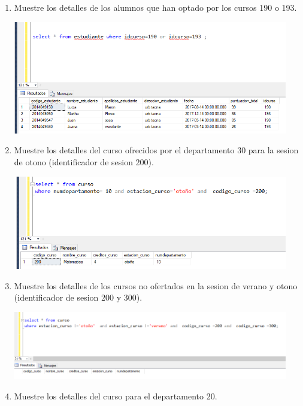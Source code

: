 \documentclass[12pt,letterpaper]{article}
\begin{document}
\begin{enumerate}[1.]
    \item Muestre los detalles de los alumnos que han optado por los cursos 190 o 193.

\begin{center}
\includegraphics[width=12cm]{./IMAGENES/imagen7}
\end{center}

    \item Muestre los detalles del curso ofrecidos por el departamento 30 para la sesion de otono (identificador de sesion 200).
    

\begin{center}
\includegraphics[width=12cm]{./IMAGENES/imagen8}
\end{center}

    
    \item  Muestre los detalles de los cursos no ofertados en la sesion de verano y otono (identificador de sesion 200 y 300).
    
 
\begin{center}
\includegraphics[width=12cm]{./IMAGENES/imagen9}
\end{center}

    \item Muestre los detalles del curso para el departamento 20.


\end{enumerate}
\end{document}
